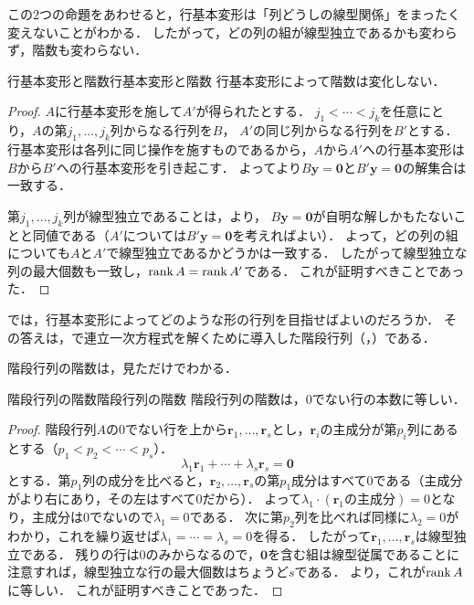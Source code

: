 この$2$つの命題をあわせると，行基本変形は「列どうしの線型関係」をまったく変えないことがわかる．
したがって，どの列の組が線型独立であるかも変わらず，階数も変わらない．

\begin{theorem}{行基本変形と階数}{行基本変形と階数}
  行基本変形によって階数は変化しない．
\end{theorem}

\begin{tleftbar}
\begin{proof}
  $A$に行基本変形を施して$A'$が得られたとする．
  $j_1 < \cdots < j_k$を任意にとり，$A$の第$j_1, \dots, j_k$列からなる行列を$B$，
  $A'$の同じ列からなる行列を$B'$とする．
  行基本変形は各列に同じ操作を施すものであるから，$A$から$A'$への行基本変形は$B$から$B'$への行基本変形を引き起こす．
  よってより$B\bm{y} = \bm{0}$と$B'\bm{y} = \bm{0}$の解集合は一致する．

  第$j_1, \dots, j_k$列が線型独立であることは，より，
  $B\bm{y} = \bm{0}$が自明な解しかもたないことと同値である（$A'$については$B'\bm{y} = \bm{0}$を考えればよい）．
  よって，どの列の組についても$A$と$A'$で線型独立であるかどうかは一致する．
  したがって線型独立な列の最大個数も一致し，$\operatorname{rank} A = \operatorname{rank} A'$である．
  これが証明すべきことであった．
\end{proof}
\end{tleftbar}

では，行基本変形によってどのような形の行列を目指せばよいのだろうか．
その答えは，で連立一次方程式を解くために導入した階段行列（，）である．

階段行列の階数は，見ただけでわかる．

\begin{prop}{階段行列の階数}{階段行列の階数}
  階段行列の階数は，$0$でない行の本数に等しい．
\end{prop}

\begin{tleftbar}
\begin{proof}
  階段行列$A$の$0$でない行を上から$\bm{r}_1, \dots, \bm{r}_s$とし，$\bm{r}_i$の主成分が第$p_i$列にあるとする（$p_1 < p_2 < \cdots < p_s$）．
  \[
    \lambda_1 \bm{r}_1 + \cdots + \lambda_s \bm{r}_s = \bm{0}
  \]
  とする．第$p_1$列の成分を比べると，$\bm{r}_2, \dots, \bm{r}_s$の第$p_1$成分はすべて$0$である（主成分がより右にあり，その左はすべて$0$だから）．
  よって$\lambda_1 \cdot (\bm{r}_1 \text{の主成分}) = 0$となり，主成分は$0$でないので$\lambda_1 = 0$である．
  次に第$p_2$列を比べれば同様に$\lambda_2 = 0$がわかり，これを繰り返せば$\lambda_1 = \cdots = \lambda_s = 0$を得る．
  したがって$\bm{r}_1, \dots, \bm{r}_s$は線型独立である．
  残りの行は$0$のみからなるので，$\bm{0}$を含む組は線型従属であることに注意すれば，線型独立な行の最大個数はちょうど$s$である．
  より，これが$\operatorname{rank} A$に等しい．
  これが証明すべきことであった．
\end{proof}
\end{tleftbar}

